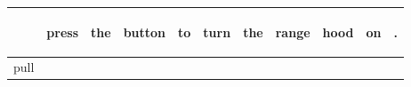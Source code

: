 \documentclass[landscape]{article}
\newcommand{\ssp}{\hspace{2pt}}
\begin{document}
\noindent\begin{tabular}{|l|p{10pt}|p{10pt}|p{10pt}|p{10pt}|p{10pt}|p{10pt}|p{10pt}|p{10pt}|p{10pt}|p{10pt}|}
\hline
&\begin{sideways}\cellcolor{ref0}press\hspace{12pt}\end{sideways}&\begin{sideways}\cellcolor{ref1}the\hspace{12pt}\end{sideways}&\begin{sideways}\cellcolor{ref2}button\hspace{12pt}\end{sideways}&\begin{sideways}\cellcolor{ref3}to\hspace{12pt}\end{sideways}&\begin{sideways}\cellcolor{ref4}turn\hspace{12pt}\end{sideways}&\begin{sideways}\cellcolor{ref5}the\hspace{12pt}\end{sideways}&\begin{sideways}\cellcolor{ref6}range\hspace{12pt}\end{sideways}&\begin{sideways}\cellcolor{ref7}hood\hspace{12pt}\end{sideways}&\begin{sideways}\cellcolor{ref8}on\hspace{12pt}\end{sideways}&\begin{sideways}\cellcolor{ref9}.\hspace{12pt}\end{sideways}\\
\hline
\ssp pull \ssp&\hspace{2pt}&\hspace{2pt}&\hspace{2pt}&\hspace{2pt}&\hspace{2pt}&\hspace{2pt}&\hspace{2pt}&\hspace{2pt}&\hspace{2pt}&\hspace{2pt}\\

\end{tabular}
\end{document}
